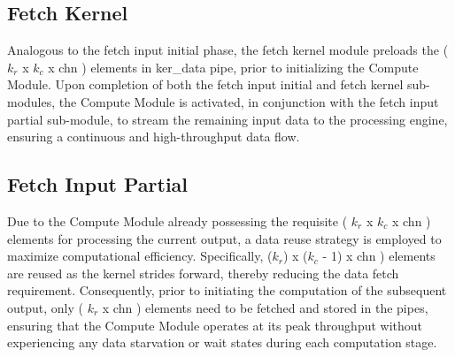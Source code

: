 \subsection{Fetch Kernel}
Analogous to the fetch input initial phase, the fetch kernel module preloads the ( $k_r$ x $k_c$ x chn ) elements in ker\_data pipe, prior to initializing the Compute Module. Upon completion of both the fetch input initial and fetch kernel sub-modules, the Compute Module is activated, in conjunction with the fetch input partial sub-module, to stream the remaining input data to the processing engine, ensuring a continuous and high-throughput data flow. 
\subsection{Fetch Input Partial}

Due to the Compute Module already possessing the requisite ( $k_r$ x $k_c$ x chn ) elements for processing the current output, a data reuse strategy is employed to maximize computational efficiency. Specifically, ($k_r$) x ($k_c$ - 1) x chn ) elements are reused as the kernel strides forward, thereby reducing the data fetch requirement. Consequently, prior to initiating the computation of the subsequent output, only ( $k_r$ x chn )  elements need to be fetched and stored in the pipes, ensuring that the Compute Module operates at its peak throughput without experiencing any data starvation or wait states during each computation stage.


